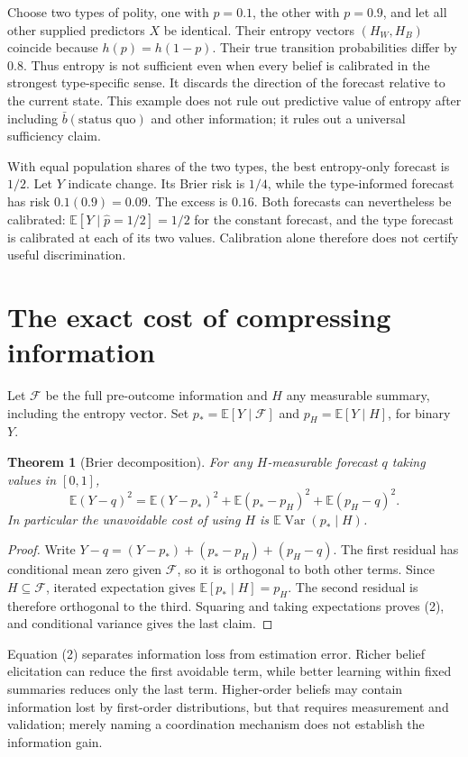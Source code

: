 \documentclass[11pt,a4paper]{article}
\newtheorem{theorem}{Theorem}[section]
\newcommand{\E}{\mathbb E}
\DeclareMathOperator{\Var}{Var}
\begin{document}
Choose two types of polity, one with $p=0.1$, the other with $p=0.9$, and let all other supplied predictors $X$ be identical. Their entropy vectors $(H_W,H_B)$ coincide because $h(p)=h(1-p)$. Their true transition probabilities differ by $0.8$. Thus entropy is not sufficient even when every belief is calibrated in the strongest type-specific sense. It discards the direction of the forecast relative to the current state. This example does not rule out predictive value of entropy after including $\bar b(\text{status quo})$ and other information; it rules out a universal sufficiency claim.

With equal population shares of the two types, the best entropy-only forecast is $1/2$. Let $Y$ indicate change. Its Brier risk is $1/4$, while the type-informed forecast has risk $0.1(0.9)=0.09$. The excess is $0.16$. Both forecasts can nevertheless be calibrated: $\E[Y\mid\widehat p=1/2]=1/2$ for the constant forecast, and the type forecast is calibrated at each of its two values. Calibration alone therefore does not certify useful discrimination.

\section{The exact cost of compressing information}
Let $\mathcal F$ be the full pre-outcome information and $H$ any measurable summary, including the entropy vector. Set $p_*=\E[Y\mid\mathcal F]$ and $p_H=\E[Y\mid H]$, for binary $Y$.

\begin{theorem}[Brier decomposition]
For any $H$-measurable forecast $q$ taking values in $[0,1]$,
\[
 \E(Y-q)^2=\E(Y-p_*)^2+
            \E(p_*-p_H)^2+\E(p_H-q)^2.                  \tag{2}
\]
In particular the unavoidable cost of using $H$ is
$\E\Var(p_*\mid H)$.
\end{theorem}
\begin{proof}
Write $Y-q=(Y-p_*)+(p_*-p_H)+(p_H-q)$. The first residual has conditional mean zero given $\mathcal F$, so it is orthogonal to both other terms. Since $H\subseteq\mathcal F$, iterated expectation gives $\E[p_*\mid H]=p_H$. The second residual is therefore orthogonal to the third. Squaring and taking expectations proves (2), and conditional variance gives the last claim.
\end{proof}

Equation (2) separates information loss from estimation error. Richer belief elicitation can reduce the first avoidable term, while better learning within fixed summaries reduces only the last term. Higher-order beliefs may contain information lost by first-order distributions, but that requires measurement and validation; merely naming a coordination mechanism does not establish the information gain.
\end{document}
